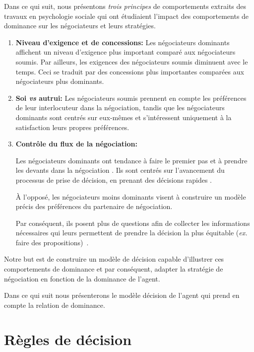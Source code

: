 	Dans ce qui suit, nous présentons \emph{trois principes} de comportements extraits des travaux en psychologie sociale qui ont étudiaient l'impact des comportements de dominance sur les négociateurs et leurs stratégies.
	
	\begin{enumerate}
		\item \textbf{Niveau d'exigence et de concessions:} Les négociateurs dominants affichent un niveau d'exigence plus important comparé aux négociateurs soumis. Par ailleurs, les exigences des négociateurs soumis diminuent avec le temps. Ceci se traduit par des concessions plus importantes comparées aux négociateurs plus dominants. \cite{de1995impact}
		
		\item \textbf{Soi \emph{vs} autrui:} Les négociateurs soumis prennent en compte les préférences de leur interlocuteur dans la négociation, tandis que les négociateurs  dominants sont centrés sur eux-mêmes et s'intéressent uniquement à la satisfaction leurs propres préférences. \cite{fiske1993controlling,de1995impact}
		
		\item \textbf{Contrôle du flux de la négociation:}
		
		Les négociateurs dominants ont tendance à faire le premier pas et à prendre les devants dans la négociation \cite {magee2007power}. Ils sont centrés sur l'avancement du processus de prise de décision, en prenant des décisions rapides \cite{zablotskaya2012relating}.
		
		À l'opposé, les négociateurs moins dominants visent à construire un modèle précis des préférences du partenaire de négociation. 
		
		Par conséquent,  ils posent plus de questions afin de collecter les informations nécessaires qui leurs permettent de prendre la décision la plus équitable (\emph{ex.}  faire des propositions)~\cite{de2004influence}.

		
	\end{enumerate}
	
	
Notre but est de construire un modèle de décision capable d'illustrer ces comportements de dominance et par conséquent, adapter la stratégie de négociation en fonction de la dominance de l'agent.

Dans ce qui suit nous présenterons le modèle décision de l'agent qui prend en compte la relation de dominance.

\section{Règles de décision}

